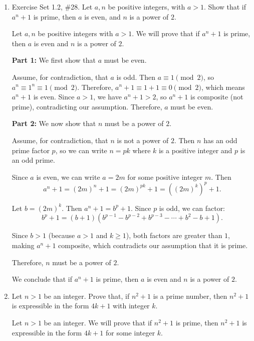 \begin{enumerate}
  \newpage

  \item Exercise Set 1.2, \#28. Let $a,n$ be positive integers, with $a > 1$. Show that if $a^{n}+1$ is prime, then $a$ is even, and $n$ is a power of $2$.
  \begin{subanswer}
    Let $a,n$ be positive integers with $a > 1$. We will prove that if $a^{n} + 1$ is prime, then $a$ is even and $n$ is a power of $2$.
    
    \textbf{Part 1:} We first show that $a$ must be even.
    
    Assume, for contradiction, that $a$ is odd. Then $a \equiv 1 \pmod{2}$, so $a^{n} \equiv 1^{n} \equiv 1 \pmod{2}$. Therefore, $a^{n} + 1 \equiv 1 + 1 \equiv 0 \pmod{2}$, which means $a^{n} + 1$ is even. Since $a > 1$, we have $a^{n} + 1 > 2$, so $a^{n} + 1$ is composite (not prime), contradicting our assumption. Therefore, $a$ must be even.
    
    \textbf{Part 2:} We now show that $n$ must be a power of $2$.
    
    Assume, for contradiction, that $n$ is not a power of $2$. Then $n$ has an odd prime factor $p$, so we can write $n = pk$ where $k$ is a positive integer and $p$ is an odd prime.
    
    Since $a$ is even, we can write $a = 2m$ for some positive integer $m$. Then
    \[
      a^{n} + 1 = (2m)^{n} + 1 = (2m)^{pk} + 1 = ((2m)^{k})^{p} + 1.
    \]
    
    Let $b = (2m)^{k}$. Then $a^{n} + 1 = b^{p} + 1$. Since $p$ is odd, we can factor:
    \[
      b^{p} + 1 = (b + 1)(b^{p-1} - b^{p-2} + b^{p-3} - \cdots + b^{2} - b + 1).
    \]
    
    Since $b > 1$ (because $a > 1$ and $k \geq 1$), both factors are greater than $1$, making $a^{n} + 1$ composite, which contradicts our assumption that it is prime.
    
    Therefore, $n$ must be a power of $2$.
    
    We conclude that if $a^{n} + 1$ is prime, then $a$ is even and $n$ is a power of $2$.
  \end{subanswer}

  \newpage

  \item Let $n > 1$ be an integer. Prove that, if $n^{2} + 1$ is a prime number, then $n^{2} + 1$ is expressible in the form $4k + 1$ with integer $k$.
  \begin{subanswer}
    Let $n > 1$ be an integer. We will prove that if $n^{2} + 1$ is prime, then $n^{2} + 1$ is expressible in the form $4k + 1$ for some integer $k$.
    

\end{subanswer}
\end{enumerate}
